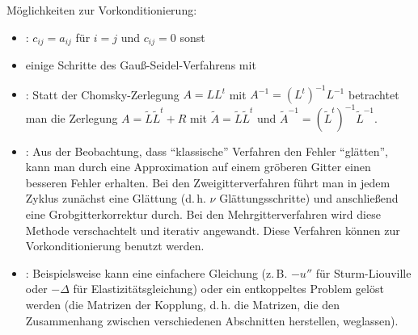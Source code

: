 \begin{Bem}
    Möglichkeiten zur Vorkonditionierung:
    \begin{itemize}
        \item
        :
        $c_{ij} = a_{ij}$ für $i = j$ und $c_{ij} = 0$ sonst
        
        \item
        einige Schritte des Gauß-Seidel-Verfahrens mit 
        
        \item
        :
        Statt der Chomsky-Zerlegung $A = LL^t$ mit $A^{-1} = (L^t)^{-1} L^{-1}$
        betrachtet man die Zerlegung $A = \widetilde{L}\widetilde{L}^t + R$
        mit $\widetilde{A} = \widetilde{L}\widetilde{L}^t$ und
        $\widetilde{A}^{-1} = (\widetilde{L}^t)^{-1} \widetilde{L}^{-1}$.
        
        \item
        :
        Aus der Beobachtung, dass "`klassische"' Verfahren den Fehler
        "`glätten"', kann man durch eine Approximation auf einem gröberen
        Gitter einen besseren Fehler erhalten.
        Bei den Zweigitterverfahren führt man in jedem Zyklus zunächst
        eine Glättung (d.\,h. $\nu$ Glättungsschritte) und anschließend
        eine Grobgitterkorrektur durch.
        Bei den Mehrgitterverfahren wird diese Methode verschachtelt und
        iterativ angewandt.
        Diese Verfahren können zur Vorkonditionierung benutzt werden.
        
        \item
        :
        Beispielsweise kann eine einfachere Gleichung
        (z.\,B. $-u''$ für Sturm-Liouville oder
        $-\Delta$ für Elastizitätsgleichung) oder
        ein entkoppeltes Problem gelöst werden
        (die Matrizen der Kopplung, d.\,h. die Matrizen, die den
        Zusammenhang zwischen verschiedenen Abschnitten herstellen,
        weglassen).
    \end{itemize}
\end{Bem}

\pagebreak
